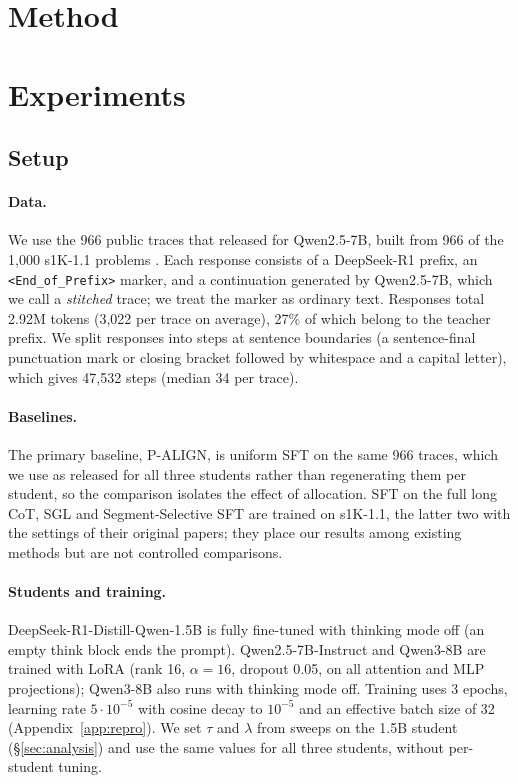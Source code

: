 \documentclass[11pt]{article}
\newcommand{\eop}{\texttt{<End\_of\_Prefix>}}
\newcommand{\uniformpalign}{P-ALIGN}
\begin{document}
\section{Method}
\label{sec:method}
% 
% 


\section{Experiments}
\label{sec:experiments}

\subsection{Setup}
\label{sec:setup}

\paragraph{Data.}
We use the 966 public traces that \citet{liu2026palign} released for Qwen2.5-7B, built from 966 of the 1,000 s1K-1.1 problems \citep{muennighoff2025s1}.
Each response consists of a DeepSeek-R1 prefix, an \eop{} marker, and a continuation generated by Qwen2.5-7B, which we call a \emph{stitched} trace; we treat the marker as ordinary text.
Responses total 2.92M tokens (3,022 per trace on average), 27\% of which belong to the teacher prefix.
We split responses into steps at sentence boundaries (a sentence-final punctuation mark or closing bracket followed by whitespace and a capital letter), which gives 47,532 steps (median 34 per trace).

\paragraph{Baselines.}
The primary baseline, \uniformpalign{}, is uniform SFT on the same 966 traces, which we use as released for all three students rather than regenerating them per student, so the comparison isolates the effect of allocation.
SFT on the full long CoT, SGL and Segment-Selective SFT are trained on s1K-1.1, the latter two with the settings of their original papers; they place our results among existing methods but are not controlled comparisons.

\paragraph{Students and training.}
DeepSeek-R1-Distill-Qwen-1.5B \citep{deepseek2025r1} is fully fine-tuned with thinking mode off (an empty think block ends the prompt).
Qwen2.5-7B-Instruct \citep{qwen2024qwen25} and Qwen3-8B \citep{qwen2025qwen3} are trained with LoRA \citep{hu2022lora} (rank 16, $\alpha=16$, dropout 0.05, on all attention and MLP projections); Qwen3-8B also runs with thinking mode off.
Training uses 3 epochs, learning rate $5\cdot10^{-5}$ with cosine decay to $10^{-5}$ and an effective batch size of 32 (Appendix~\ref{app:repro}).
We set $\tau$ and $\lambda$ from sweeps on the 1.5B student (\S\ref{sec:analysis}) and use the same values for all three students, without per-student tuning.
\end{document}

